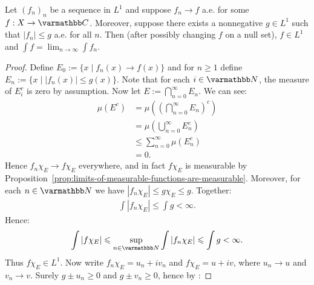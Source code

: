 \begin{theorem}\label{thm:dct}
    Let $(f_n)_n$ be a sequence in $L^1$ and suppose $f_n \rightarrow f$ a.e. for some $f:X \rightarrow \bfC$. Moreover, suppose there exists a nonnegative $g \in L^1$ such that  $|f_n| \leq g$ a.e. for all $n$. Then (after possibly changing $f$ on a null set), $f \in L^1$ and $\int f = \lim_{n \rightarrow \infty} \int f_n$.
\end{theorem}
    \begin{proof}
        Define $E_0 := \{x \mid f_n(x) \rightarrow f(x)\}$ and for $n \geq 1$ define $E_n := \{x \mid |f_n(x)| \leq g(x)\}$. Note that for each $i \in \bfN$, the measure of $E_i^c$ is zero by assumption. Now let $E := \bigcap_{n = 0}^\infty E_n$. We can see:
            \begin{equation*}
            \begin{split}
                \mu(E^c)
                & = \mu \left( \left( \bigcap_{n = 0}^\infty E_n \right)^c \right) \\
                & = \mu \left( \bigcup_{n = 0}^\infty E_n^c \right) \\
                & \leq \sum_{n = 0}^\infty \mu(E_n^c) \\
                & = 0.
            \end{split}
            \end{equation*}
        Hence $f_n \chi_E \rightarrow f \chi_E$ everywhere, and in fact $f \chi_E$ is measurable by Proposition~\ref{prop:limits-of-measurable-functions-are-measurable}. Moreover, for each $n \in \bfN$ we have $|f_n \chi_E | \leq g \chi_E \leq g$. Together:
            \begin{equation*}
            \begin{split}
                \int |f_n \chi_E| \leq \int g < \infty.
            \end{split}
            \end{equation*}
        Hence:
            \begin{equation*}
            \begin{split}
                \int |f \chi_E| \leq \sup_{n \in \bfN}\int |f_n \chi_E| \leq \int g < \infty.
            \end{split}
            \end{equation*}
        Thus $f \chi_E \in L^1$. Now write $f_n \chi_E = u_n +i v_n$ and $f \chi_E = u + iv$, where $u_n \rightarrow u$ and $v_n \rightarrow v$. Surely $g \pm u_n \geq 0$ and $g \pm v_n \geq 0$, hence by :

\end{proof}
